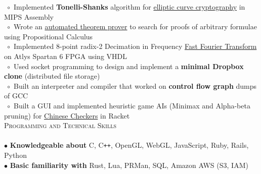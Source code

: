 \documentclass[a4paper,9pt]{article}
\begin{document}
$\;\circ$ Implemented \textbf{Tonelli-Shanks} algorithm for \href{https://github.com/wenderen/ecc-asm}{elliptic curve cryptography} in MIPS Assembly\\
$\;\circ$ Wrote an \href{https://github.com/wenderen/theorem-prover}{automated theorem prover} to search for proofs of arbitrary formulae using Propositional Calculus\\
$\;\circ$ Implemented 8-point radix-2 Decimation in Frequency \href{https://github.com/wenderen/fft}{Fast Fourier Transform} on Atlys Spartan 6 FPGA using VHDL\\
$\;\circ$ Used socket programming to design and implement a \textbf{minimal Dropbox clone} (distributed file storage)\\
$\;\circ$ Built an interpreter and compiler that worked on \textbf{control flow graph} dumps of GCC\\
$\;\circ$ Built a GUI and implemented heuristic game AIs (Minimax and Alpha-beta pruning) for \href{https://github.com/wenderen/chinese-checkers}{Chinese Checkers} in Racket\\

\textcolor{myrust}{\large{\textsc{Programming and Technical Skills}}}\textcolor{mygray}{\sout{\hfill}}\\\\
\normalsize
$\bullet$ \textbf{Knowledgeable about} C, C\verb!++!, OpenGL, WebGL, JavaScript, Ruby, Rails, Python\\
$\bullet$ \textbf{Basic familiarity with} Rust, Lua, PRMan, SQL, Amazon AWS (S3, IAM)\\

\end{document}
